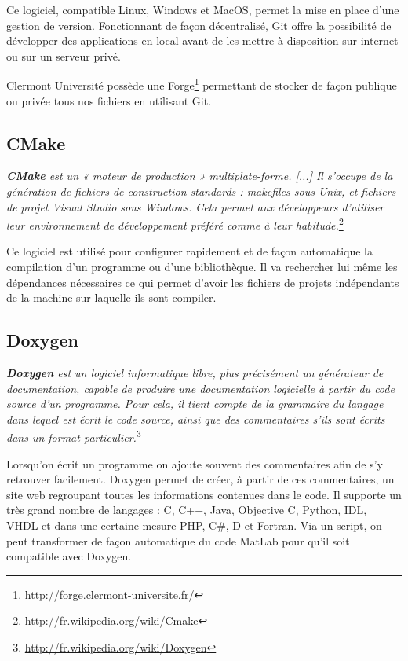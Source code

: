 \documentclass[a4paper,oneside]{article}
\begin{document}
  \vspace{5mm}
Ce logiciel, compatible Linux, Windows et MacOS, permet la mise en place d'une gestion de version.
Fonctionnant de façon décentralisé, Git offre la possibilité de développer des applications en local avant de les mettre à disposition sur internet ou sur un serveur privé.

Clermont Université possède une Forge\footnote{\url{http://forge.clermont-universite.fr/}} permettant de stocker de façon publique ou privée tous nos fichiers en utilisant Git.
  
\subsection{CMake}

  \textit{\textbf{CMake} est un « moteur de production » multiplate-forme. [...] Il s'occupe de la génération de fichiers de construction standards : makefiles sous Unix, et fichiers de projet Visual Studio sous Windows. Cela permet aux développeurs d'utiliser leur environnement de développement préféré comme à leur habitude.}\footnote{\url{http://fr.wikipedia.org/wiki/Cmake}}

  \vspace{5mm}
Ce logiciel est utilisé pour configurer rapidement et de façon automatique la compilation d'un programme ou d'une bibliothèque.
Il va rechercher lui même les dépendances nécessaires ce qui permet d'avoir les fichiers de projets indépendants de la machine sur laquelle ils sont compiler.

  
\subsection{Doxygen}

   \textit{\textbf{Doxygen} est un logiciel informatique libre, plus précisément un générateur de documentation, capable de produire une documentation logicielle à partir du code source d'un programme. Pour cela, il tient compte de la grammaire du langage dans lequel est écrit le code source, ainsi que des commentaires s'ils sont écrits dans un format particulier.}\footnote{\url{http://fr.wikipedia.org/wiki/Doxygen}}

  \vspace{5mm}
Lorsqu'on écrit un programme on ajoute souvent des commentaires afin de s'y retrouver facilement.
Doxygen permet de créer, à partir de ces commentaires, un site web regroupant toutes les informations contenues dans le code.
Il supporte un très grand nombre de langages :  C, C++, Java, Objective C, Python, IDL, VHDL et dans une certaine mesure PHP, C\#, D et Fortran.
Via un script, on peut transformer de façon automatique du code MatLab pour qu'il soit compatible avec Doxygen.
\end{document}
